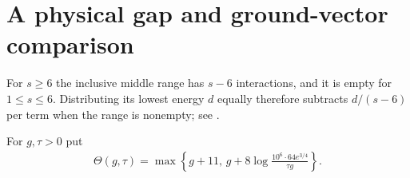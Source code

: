 \section{A physical gap and ground-vector comparison}

For $s\ge6$ the inclusive middle range has $s-6$ interactions, and it is
empty for $1\le s\le6$. Distributing its lowest energy $d$ equally
therefore subtracts $d/(s-6)$ per term when the range is nonempty; see \cite{gap:aklv13_two_block_robustness}.

\begin{definition}
    \label{def:aklv_two_block_threshold}
    \leanok
    For $g,\tau>0$ put
    \begin{align}
        \Theta(g,\tau)=\max\left\{g+11,\,
        g+8\log\frac{10^6\cdot64e^{3/4}}{\tau g}\right\}.
        \label{eq:aklv_cluster_threshold}
    \end{align}
\end{definition}

